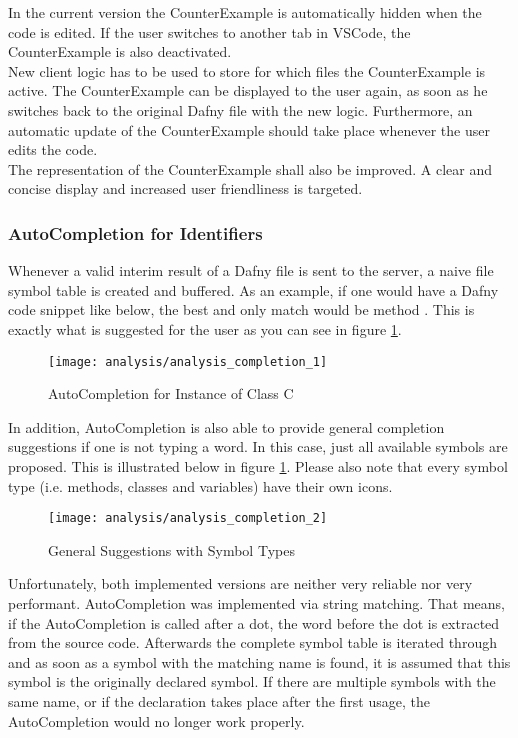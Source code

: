 In the current version the CounterExample is automatically hidden when the code is edited.
If the user switches to another tab in VSCode, the CounterExample is also deactivated. \\

New client logic has to be used to store for which files the CounterExample is active.
The CounterExample can be displayed to the user again, as soon as he switches back to the original Dafny file with the new logic.
Furthermore, an automatic update of the CounterExample should take place whenever the user edits the code.\\

The representation of the CounterExample shall also be improved.
A clear and concise display and increased user friendliness is targeted.\\

\subsubsection{AutoCompletion for Identifiers}
Whenever a valid interim result of a Dafny file is sent to the server, a naive file symbol table is created and buffered.
As an example, if one would have a Dafny code snippet like below, the best and only match would be method .
This is exactly what is suggested for the user as you can see in figure \ref{fig:analysis_completion_1}.

\begin{figure}[H]
    \centering
    \texttt{[image: analysis/analysis\_completion\_1]}
    \caption{AutoCompletion for Instance of Class C}
    \label{fig:analysis_completion_1}
\end{figure}

In addition, AutoCompletion is also able to provide general completion suggestions if one is not typing a word.
In this case, just all available symbols are proposed.
This is illustrated below in figure \ref{fig:analysis_completion_1}.
Please also note that every symbol type (i.e. methods, classes and variables) have their own icons.

\begin{figure}[H]
    \centering
    \texttt{[image: analysis/analysis\_completion\_2]}
    \caption{General Suggestions with Symbol Types}
    \label{fig:analysis_completion_2}
\end{figure}

Unfortunately, both implemented versions are neither very reliable nor very performant.
AutoCompletion was implemented via string matching.
That means, if the AutoCompletion is called after a dot, the word before the dot is extracted from the source code.
Afterwards the complete symbol table is iterated through and as soon as a symbol with the matching name is found,
it is assumed that this symbol is the originally declared symbol.
If there are multiple symbols with the same name, or if the declaration takes place after the first usage,
the AutoCompletion would no longer work properly. \\

